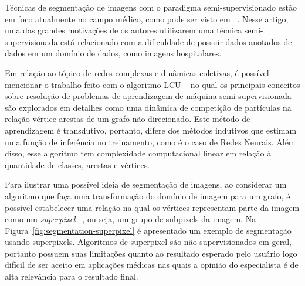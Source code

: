 Técnicas de segmentação de imagens com o paradigma semi-supervisionado
estão em foco atualmente no campo médico, como pode ser visto em
~\cite{LuoSemiSupervised2021}. Nesse artigo, uma das grandes
motivações de os autores utilizarem uma técnica semi-supervisionada
está relacionado com a dificuldade de possuir dados anotados de dados
em um domínio de dados, como imagens hospitalares.

Em relação ao tópico de redes complexas e dinâmicas coletivas, é
possível mencionar o trabalho feito com o algoritmo \gls{LCU}
~\cite{VerriNetworkUnfoldingMap2018} no qual os principais conceitos
sobre resolução de problemas de aprendizagem de máquina
semi-supervisionada são explorados em detalhes como uma dinâmica de
competição de partículas na relação vértice-arestas de um grafo
não-direcionado. Este método de aprendizagem é transdutivo, portanto,
difere dos métodos indutivos que estimam uma função de inferência no
treinamento, como é o caso de Redes Neurais. Além disso, esse
algoritmo tem complexidade computacional linear em relação à
quantidade de classes, arestas e vértices.

Para ilustrar uma possível ideia de segmentação de imagens, ao
considerar um algoritmo que faça uma transformação do domínio de
imagem para um grafo, é possível estabelecer uma relação na qual os
vértices representam parte da imagem como um \textit{superpixel}
~\cite{SuperpixelSurvey2020}, ou seja, um grupo de subpixels da
imagem. Na Figura~\ref{fig:segmentation-superpixel} é apresentado um
exemplo de segmentação usando superpixels. Algoritmos de superpixel
são não-supervisionados em geral, portanto possuem suas limitações
quanto ao resultado esperado pelo usuário \textendash\hfill logo
difícil de ser aceito em aplicações médicas nas quais a opinião do
especialista é de alta relevância para o resultado final.

\begin{figure}[!h]
        \captionsetup{width=9cm}
		\centering
\end{figure}



